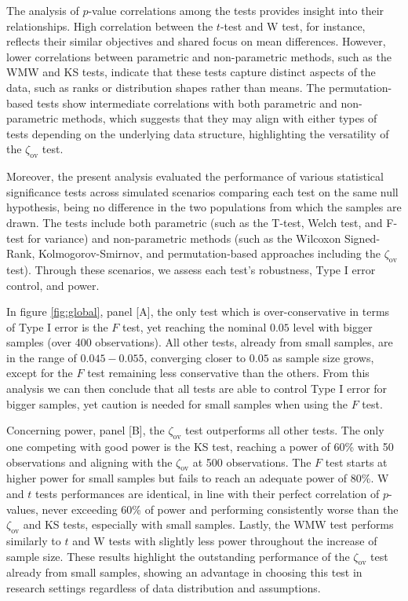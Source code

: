 \documentclass[twocolumn]{article}\usepackage[]{graphicx}\usepackage[]{xcolor}
\begin{document}
The analysis of $p$-value correlations among the tests provides insight into their relationships. High correlation between the $t$-test and W test, for instance, reflects their similar objectives and shared focus on mean differences. However, lower correlations between parametric and non-parametric methods, such as the WMW and KS tests, indicate that these tests capture distinct aspects of the data, such as ranks or distribution shapes rather than means. The permutation-based tests show intermediate correlations with both parametric and non-parametric methods, which suggests that they may align with either types of tests depending on the underlying data structure, highlighting the versatility of the $\zeta_{\mbox{ov}}$ test.


Moreover, the present analysis evaluated the performance of various statistical significance tests across simulated scenarios comparing each test on the same null hypothesis, being no difference in the two populations from which the samples are drawn. The tests include both parametric (such as the T-test, Welch test, and F-test for variance) and non-parametric methods (such as the Wilcoxon Signed-Rank, Kolmogorov-Smirnov, and permutation-based approaches including the $\zeta_{\mbox{ov}}$ test). Through these scenarios, we assess each test's robustness, Type I error control, and power.

In figure \ref{fig:global}, panel [A], the only test which is over-conservative in terms of Type I error is the $F$ test, yet reaching the nominal $0.05$ level with bigger samples (over 400 observations). All other tests, already from small samples, are in the range of $0.045 - 0.055$, converging closer to $0.05$ as sample size grows, except for the $F$ test remaining less conservative than the others. From this analysis we can then conclude that all tests are able to control Type I error for bigger samples, yet caution is needed for small samples when using the $F$ test.

Concerning power, panel [B], the $\zeta_{\mbox{ov}}$ test outperforms all other tests. The only one competing with good power is the KS test, reaching a power of 60\% with 50 observations and aligning with the $\zeta_{\mbox{ov}}$ at 500 observations. The $F$ test starts at higher power for small samples but fails to reach an adequate power of 80\%. W and $t$ tests performances are identical, in line with their perfect correlation of $p$-values, never exceeding 60\% of power and performing consistently worse than the $\zeta_{\mbox{ov}}$ and KS tests, especially with small samples. Lastly, the WMW test performs similarly to $t$ and W tests with slightly less power throughout the increase of sample size. These results highlight the outstanding performance of the $\zeta_{\mbox{ov}}$ test already from small samples, showing an advantage in choosing this test in research settings regardless of data distribution and assumptions.
\end{document}
